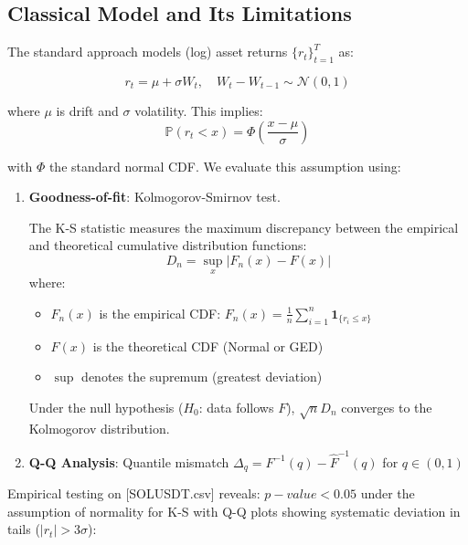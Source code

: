 \documentclass[12pt]{article}
\begin{document}
\subsection{Classical Model and Its Limitations}
The standard approach models (log) asset returns $\{r_t\}_{t=1}^T$ as:

\begin{equation}
    r_t = \mu + \sigma W_t, \quad W_t - W_{t-1} \sim \mathcal{N}(0,1)
\end{equation}

where $\mu$ is drift and $\sigma$ volatility. This implies:
\begin{equation}
    \mathbb{P}(r_t < x) = \Phi\left(\frac{x-\mu}{\sigma}\right)
\end{equation}

with $\Phi$ the standard normal CDF. We evaluate this assumption using:

\newcommand{\AD}{A^2_n}

\begin{enumerate}
    \item \textbf{Goodness-of-fit}: Kolmogorov-Smirnov test.

    The K-S statistic measures the maximum discrepancy between the empirical and theoretical cumulative distribution functions:
    \begin{equation}
    D_n = \sup_{x} \left| F_n(x) - F(x) \right|
    \end{equation}
    where:
    \begin{itemize}
        \item $F_n(x)$ is the empirical CDF: $F_n(x) = \frac{1}{n} \sum_{i=1}^n \mathbf{1}_{\{r_i \leq x\}}$
        \item $F(x)$ is the theoretical CDF (Normal or GED)
        \item $\sup$ denotes the supremum (greatest deviation)
    \end{itemize}
    Under the null hypothesis ($H_0$: data follows $F$), $\sqrt{n}D_n$ converges to the Kolmogorov distribution.

    \item \textbf{Q-Q Analysis}: Quantile mismatch $\Delta_q = F^{-1}(q) - \hat{F}^{-1}(q)$ for $q \in (0,1)$
\end{enumerate}

Empirical testing on [SOLUSDT.csv] reveals:
$p-value < 0.05$ under the assumption of normality for K-S with Q-Q plots showing systematic deviation in tails ($|r_t| > 3\sigma$):
\end{document}
